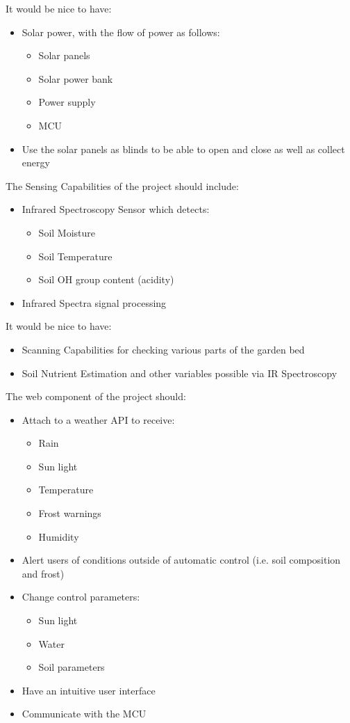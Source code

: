 It would be nice to have:
\begin{itemize}
  \item Solar power, with the flow of power as follows:
  \begin{itemize}
    \item Solar panels 
    \item Solar power bank 
    \item Power supply 
    \item MCU
  \end{itemize}
  \item Use the solar panels as blinds to be able to open and close as well as collect energy
\end{itemize}
The Sensing Capabilities of the project should include:
\begin{itemize}
    \item Infrared Spectroscopy Sensor which detects:
    \begin{itemize}
            \item Soil Moisture
            \item Soil Temperature
            \item Soil OH group content (acidity)
    \end{itemize}
    \item Infrared Spectra signal processing
\end{itemize}
It would be nice to have:
\begin{itemize}
    \item Scanning Capabilities for checking various parts of the garden bed
    \item Soil Nutrient Estimation and other variables possible via IR Spectroscopy
\end{itemize}
The web component of the project should:
\begin{itemize}
    \item Attach to a weather API to receive:
    \begin{itemize}
        \item Rain
        \item Sun light
        \item Temperature
        \item Frost warnings
        \item Humidity
    \end{itemize}
    \item Alert users of conditions outside of automatic control (i.e. soil composition and frost)
    \item Change control parameters:
    \begin{itemize}
        \item Sun light
        \item Water
        \item Soil parameters
    \end{itemize}
    \item Have an intuitive user interface
    \item Communicate with the MCU
\end{itemize}
